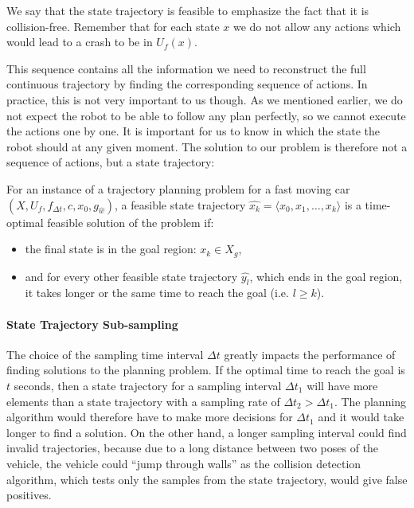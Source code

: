 We say that the state trajectory is feasible to emphasize the fact that it is collision-free. Remember that for each state $x$ we do not allow any actions which would lead to a crash to be in $U_f(x)$.

This sequence contains all the information we need to reconstruct the full continuous trajectory by finding the corresponding sequence of actions. In practice, this is not very important to us though. As we mentioned earlier, we do not expect the robot to be able to follow any plan perfectly, so we cannot execute the actions one by one. It is important for us to know in which the state the robot should at any given moment. The solution to our problem is therefore not a sequence of actions, but a state trajectory:

\begin{defn}
	For an instance of a trajectory planning problem for a fast moving car $\left(X, U_f, f_{\Delta t}, c, x_0, g_{\hat{w}}\right)$, a feasible state trajectory $\hat{x_k}=\langle x_0, x_1, \ldots, x_k \rangle$ is a time-optimal feasible solution of the problem if:
	\begin{itemize}
		\item the final state is in the goal region: $x_k \in X_g$,
		\item and for every other feasible state trajectory $\hat{y_l}$, which ends in the goal region, it takes longer or the same time to reach the goal (i.e. $l \geq k$).
	\end{itemize}
\end{defn}

\paragraph{State Trajectory Sub-sampling}

The choice of the sampling time interval $\Delta t$ greatly impacts the performance of finding solutions to the planning problem. If the optimal time to reach the goal is $t$ seconds, then a state trajectory for a sampling interval $\Delta t_1$ will have more elements than a state trajectory with a sampling rate of $\Delta t_2 > \Delta t_1$. The planning algorithm would therefore have to make more decisions for $\Delta t_1$ and it would take longer to find a solution. On the other hand, a longer sampling interval could find invalid trajectories, because due to a long distance between two poses of the vehicle, the vehicle could ``jump through walls'' as the collision detection algorithm, which tests only the samples from the state trajectory, would give false positives.

